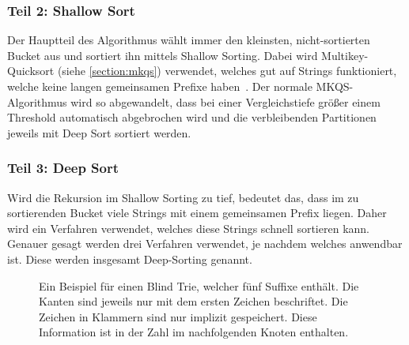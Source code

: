 \subsubsection{Teil 2: Shallow Sort}

Der Hauptteil des Algorithmus wählt immer den kleinsten,
nicht-sortierten Bucket aus und sortiert ihn mittels Shallow Sorting.
Dabei wird Multikey-Quicksort (siehe \cref{section:mkqs}) verwendet,
welches gut auf Strings funktioniert, welche keine langen gemeinsamen Prefixe haben~\cite{saca:4}.
Der normale MKQS-Algorithmus wird so abgewandelt,
dass bei einer Vergleichstiefe größer einem Threshold automatisch abgebrochen wird
und die verbleibenden Partitionen jeweils mit Deep Sort sortiert werden.

\subsubsection{Teil 3: Deep Sort}

Wird die Rekursion im Shallow Sorting zu tief, bedeutet das,
dass im zu sortierenden Bucket viele Strings mit einem gemeinsamen Prefix liegen.
Daher wird ein Verfahren verwendet, welches diese Strings schnell sortieren kann.
Genauer gesagt werden drei Verfahren verwendet, je nachdem welches anwendbar ist.
Diese werden insgesamt Deep-Sorting genannt.

\begin{figure}[!h]
\centering
\newcommand{\tnode}{\node[draw,circle]}
\newcommand{\trans}{\draw[-stealth]}
\caption[Beispiel für einen Blind Trie]{Ein Beispiel für einen Blind Trie, welcher fünf Suffixe enthält. Die Kanten sind jeweils nur mit dem ersten Zeichen beschriftet. Die Zeichen in Klammern sind nur implizit gespeichert. Diese Information ist in der Zahl im nachfolgenden Knoten enthalten.}
\label{fg:blindtrie}
\end{figure}


